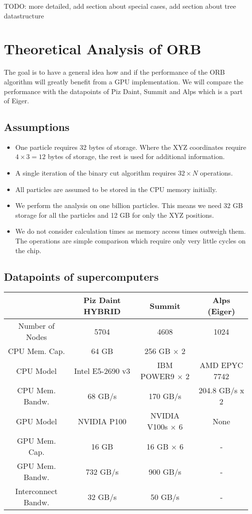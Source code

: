 \documentclass[]{article}
\begin{document}
TODO: more detailed, add section about special cases, add section about tree datastructure
\section{Theoretical Analysis of ORB}

The goal is to have a general idea how and if the performance of the ORB algorithm will greatly benefit from a GPU implementation. We will compare the performance with the datapoints of Piz Daint, Summit and Alps which is a part of Eiger. 

\subsection{Assumptions} 
\begin{itemize}
	\item 
	One particle requires 32 bytes of storage. Where the XYZ coordinates require $4\times3 = 12$ bytes of storage, the rest is used for additional information.
	
	\item
	A single iteration of the binary cut algorithm requires $32 \times N$ operations.
	
	\item 
	All particles are assumed to be stored in the CPU memory initially.
	
	\item
	We perform the analysis on one billion particles. This means we need 32 GB storage for all the particles and 12 GB for only the XYZ positions.
	
	\item
	We do not consider calculation times as memory access times  outweigh them. The operations are simple comparison  which require only very little cycles on the chip. 
\end{itemize}

\subsection{Datapoints of supercomputers}

\small
\begin{center}
	\begin{tabular}{ c c c c }
		& Piz Daint HYBRID \cite{piz_daint} & Summit & Alps (Eiger) \\ 
		\hline
		Number of Nodes & 5704 & 4608 & 1024\\
		CPU Mem. Cap. & 64 GB & 256 GB $\times$ 2  \\   
		CPU Model & Intel E5-2690 v3 & IBM POWER9 $\times$ 2 & AMD EPYC 7742 \\
		CPU Mem. Bandw.  & 68 GB/s & 170 GB/s & 204.8 GB/s x 2	\\
		GPU Model & NVIDIA P100 & NVIDIA V100s  $\times$ 6 & None \\
		GPU Mem. Cap. & 16 GB & 16 GB $\times$ 6 & -\\
		GPU Mem. Bandw. & 732 GB/s & 900 GB/s & -\\
		Interconnect Bandw. & 32 GB/s & 50 GB/s & -\\
	\end{tabular}
\end{center}
\normalfont
\end{document}
